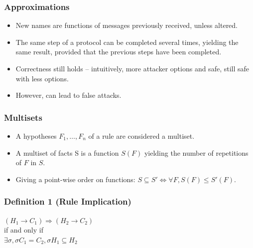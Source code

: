 \documentclass[10pt]{beamer}
\begin{document}
\begin{frame}
  \frametitle{Approximations}

  \begin{itemize}
    \item New names are functions of messages previously received, unless altered.
    \item The same step of a protocol can be completed several times, yielding the same result, provided that the previous steps have been completed.\\[3em]
    \item Correctness still holds -- intuitively, more attacker options and safe, still safe with less options.
    \item However, can lead to false attacks.
  \end{itemize}
\end{frame}

\begin{frame}
  \frametitle{Multisets}

  \begin{itemize}
    \item A hypotheses $F_1, \dots, F_n$ of a rule are considered a multiset.
    \item A multiset of facts S is a function $S(F)$ yielding the number of repetitions of $F$ in $S$.
    \item Giving a point-wise order on functions: $S \subseteq S' \Leftrightarrow \forall F, S(F) \leq S'(F)$.
  \end{itemize}
\end{frame}

\begin{frame}
  \frametitle{Definition 1 (Rule Implication)}
  \centering

  $(H_1 \rightarrow C_1) \Rightarrow (H_2 \rightarrow C_2)$\\
  if and only if\\
  $\exists \sigma, \sigma C_1 = C_2, \sigma H_1 \subseteq H_2$
\end{frame}
\end{document}
